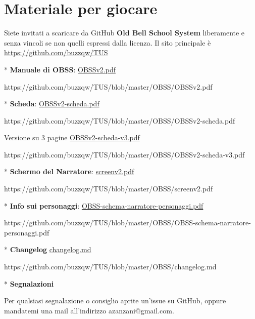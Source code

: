 \section{Materiale per giocare}

\label{scheda-e-manuale}

Siete invitati a scaricare da GitHub \textbf{Old Bell School System} liberamente e senza vincoli se non quelli espressi dalla licenza.
Il sito principale è \href{https://github.com/buzzqw/TUS}{https://github.com/buzzqw/TUS}

\medskip

* \textbf{Manuale di OBSS}:
\href{https://github.com/buzzqw/TUS/blob/master/OBSS/OBSSv2.pdf}{OBSSv2.pdf}

https://github.com/buzzqw/TUS/blob/master/OBSS/OBSSv2.pdf

\smallskip

* \textbf{Scheda}:
\href{https://github.com/buzzqw/TUS/blob/master/OBSS/OBSSv2-scheda.pdf}{OBSSv2-scheda.pdf}

https://github.com/buzzqw/TUS/blob/master/OBSS/OBSSv2-scheda.pdf

\smallskip

Versione su 3 pagine
\href{https://github.com/buzzqw/TUS/blob/master/OBSS/OBSSv2-scheda-v3.pdf}{OBSSv2-scheda-v3.pdf}

https://github.com/buzzqw/TUS/blob/master/OBSS/OBSSv2-scheda-v3.pdf

\smallskip

* \textbf{Schermo del Narratore}:
\href{https://github.com/buzzqw/TUS/blob/master/OBSS/screenv2.pdf}{screenv2.pdf}

https://github.com/buzzqw/TUS/blob/master/OBSS/screenv2.pdf

\smallskip

* \textbf{Info sui personaggi}:
\href{https://github.com/buzzqw/TUS/blob/master/OBSS/OBSS-schema-narratore-personaggi.pdf}{OBSS-schema-narratore-personaggi.pdf}

https://github.com/buzzqw/TUS/blob/master/OBSS/OBSS-schema-narratore-personaggi.pdf

\smallskip

* \textbf{Changelog} \href{https://github.com/buzzqw/TUS/blob/master/OBSS/changelog.md}{changelog.md}

https://github.com/buzzqw/TUS/blob/master/OBSS/changelog.md

\smallskip

* \textbf{Segnalazioni}

Per qualsiasi segnalazione o consiglio aprite un'issue su GitHub, oppure mandatemi una mail all'indirizzo azanzani@gmail.com.


